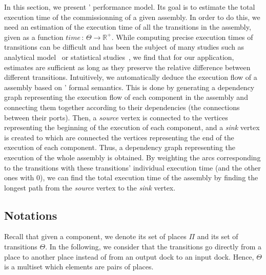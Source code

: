 In this section, we present \mad' performance model. Its goal is to
estimate the total execution time of the commissionning of a
given \mad assembly. In order to do this, we need an estimation of the
execution time of all the transitions in the assembly, given as a
function $time\,:\,\Theta\rightarrow\mathbb{R}^{+}$.  While computing
precise execution times of transitions can be difficult and has been
the subject of many studies such as analytical model~\cite{} or
statistical studies~\cite{}, we find that for our application,
estimates are sufficient as long as they preserve the relative
difference between different transitions.
%
Intuitively, we automatically deduce the execution flow of a \mad
assembly based on \mad' formal semantics. This is done by generating a
dependency graph representing the execution flow of each \mad
component in the assembly and connecting them together according to their
dependencies (the connections between their ports). Then, a
\emph{source} vertex is connected to the vertices representing the beginning of
the execution of each component, and a \emph{sink} vertex is created to which
are connected the vertices representing the end of the execution of each
component.
%
Thus, a dependency graph representing the execution of the whole
assembly is obtained. By weighting the arcs corresponding to the transitions with
these transitions' individual execution time (and the other ones with 0),
we can find the total execution time of the assembly by finding the longest
path from the \emph{source} vertex to the \emph{sink} vertex.



\subsection{Notations}

Recall that given a component, we denote its set of places $\Pi$ and its
set of transitions $\Theta$. In the following, we consider that the
transitions go directly from a place to
another place instead of from an output dock to an input dock.
Hence, $\Theta$ is a multiset which elements are pairs of places.

